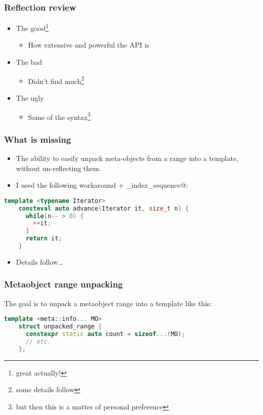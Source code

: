 \documentclass[compress,table,xcolor=table]{beamer}
\begin{document}
\begin{frame}
  \frametitle{Reflection review}
    \Huge
    \begin{itemize}
    \item{The good\footnote{great actually!}}
        \begin{itemize}
        \Large
        \item{How extensive and powerful the API is}
        \end{itemize}
    \item{The bad}
        \begin{itemize}
        \Large
        \item{Didn't find much\footnote{some details follow}}
        \end{itemize}
    \item{The ugly}
        \begin{itemize}
        \Large
        \item{Some of the syntax\footnote{but then this is a matter of personal preference}}
        \end{itemize}
    \end{itemize}
\end{frame}
\begin{frame}[fragile]
\frametitle{What is missing}
    \Large
    \begin{itemize}
    \item The ability to easily unpack meta-objects from a range into a template,
        without un-reflecting them.
    \item I used the following workaround + \verb@make_index_sequence@:
    \end{itemize}
    \begin{lstlisting}[language=c++]
    template <typename Iterator>
    consteval auto advance(Iterator it, size_t n) {
      while(n-- > 0) {
        ++it;
      }
      return it;
    }
    \end{lstlisting}
    \begin{itemize}
    \item Details follow\ldots
    \end{itemize}
\end{frame}
\begin{frame}[fragile]
\frametitle{Metaobject range unpacking}
  \Large
  The goal is to unpack a metaobject range into a template like this:
    \begin{lstlisting}[language=c++]
    template <meta::info... MO>
    struct unpacked_range {
      constexpr static auto count = sizeof...(MO);
      // etc.
    };
    \end{lstlisting}
\end{frame}
\end{document}
